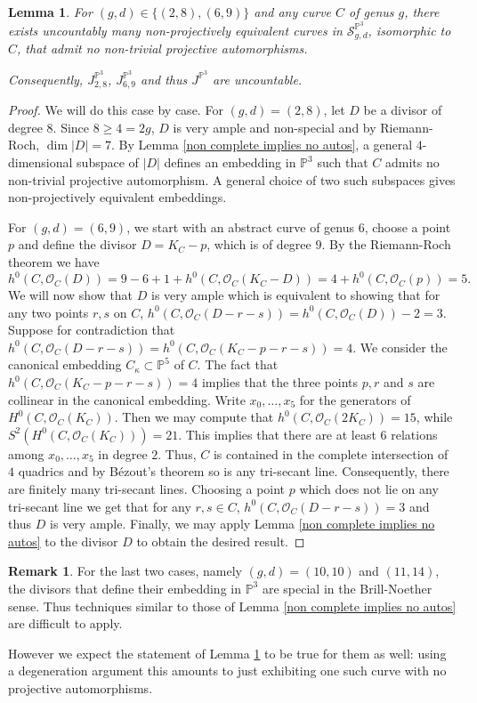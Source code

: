 \documentclass[JEP,XML,SOM,Unicode,published]{cedram}
\theoremstyle{plain}
\newtheorem{lemma}[theorem]{Lemma}
\theoremstyle{definition}
\newtheorem{remark}[theorem]{Remark}
\newcommand{\OO}{\mathcal{O}}
\newcommand{\PP}{\mathbb{P}}
\begin{document}
\begin{lemma}\label{no projective autos}
For $(g,d) \in \{(2,8),(6,9)\}$ and any curve $C$ of genus $g$,
there exists uncountably many non-projectively equivalent curves in $\mathcal{S}_{g,d}^{\PP^3}$, isomorphic to $C$, that admit no non-trivial projective automorphisms.

Consequently, $J^{\PP^3}_{2,8}$, $J^{\PP^3}_{6,9}$ and thus $J^{\PP^3}$ are uncountable.
\end{lemma}

\begin{proof}
We will do this case by case. For $(g,d) = (2,8)$, let $D$ be a divisor of degree $8$. Since $8 \geq 4 = 2g$, $D$ is very ample and non-special and by Riemann-Roch, $\dim \lvert D \rvert = 7$. By Lemma \ref{non complete implies no autos}, a general $4$-dimensional subspace of $|D|$ defines an embedding in $\PP^3$ such that $C$ admits no non-trivial projective automorphism. A general choice of two such subspaces gives non-projectively equivalent embeddings.

For $(g,d) = (6,9)$, we start with an abstract curve of genus $6$, choose a point $p$ and define the divisor $D = K_C - p$, which is of degree $9$. By the Riemann-Roch theorem we have
\[
h^0(C, \OO_C(D)) = 9 - 6 +1 + h^0(C,\OO_C(K_C - D)) = 4 + h^0(C, \OO_C(p)) = 5.
\]
We will now show that $D$ is very ample which is equivalent to showing that for any two points $r,s$ on $C$, $h^0(C,\OO_C(D-r-s)) = h^0(C,\OO_C(D)) - 2 = 3$.
Suppose for contradiction that $h^0(C,\OO_C(D-r-s))= h^0(C,\OO_C(K_C - p -r-s)) = 4$.
We consider the canonical embedding $C_{\kappa} \subset \PP^5$ of $C$.
The fact that $h^0(C,\OO_C(K_C - p -r-s)) = 4$ implies that the three points $p,r$ and $s$ are collinear in the canonical embedding.
Write $ x_0,\dots,x_5$ for the generators of $H^0(C,\OO_C(K_C))$. Then we may compute that $h^0(C,\OO_C(2K_C)) = 15$, while $S^2\left(H^0(C,\OO_C(K_C))\right) = 21$. This implies that there are at least $6$ relations among $x_0,\dots,x_5$ in degree $2$.
Thus, $C$ is contained in the complete intersection of $4$ quadrics and by Bézout's theorem so is any tri-secant line. Consequently, there are finitely many tri-secant lines.
Choosing a point $p$ which does not lie on any tri-secant line we get that for any $r,s \in C$, $h^0(C,\OO_C(D-r-s)) = 3$ and thus $D$ is very ample.
Finally, we may apply Lemma \ref{non complete implies no autos} to the divisor $D$ to obtain the desired result.
\end{proof}

\begin{remark}
For the last two cases, namely $(g,d) = (10,10)$ and $(11,14)$, the divisors that define their embedding in $\PP^3$ are special in the Brill-Noether sense.
Thus techniques similar to those of Lemma \ref{non complete implies no autos} are difficult to apply.

However we expect the statement of Lemma \ref{no projective autos} to be true for them as well:
using a degeneration argument this amounts to just exhibiting one such curve with no projective automorphisms.
\end{remark}
\end{document}
